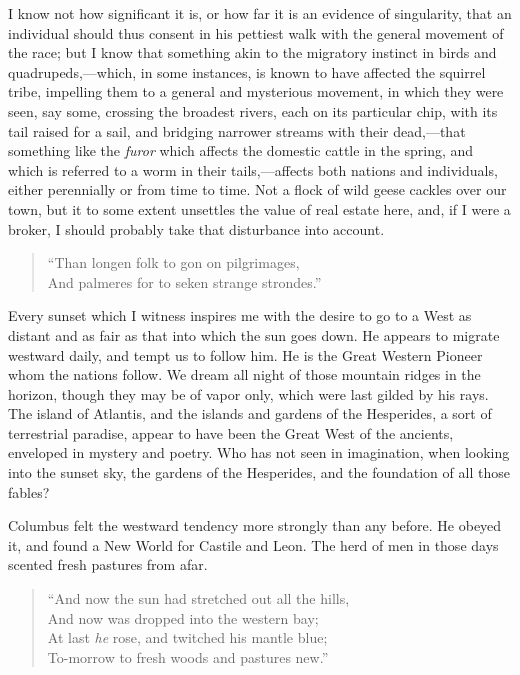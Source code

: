 \documentclass[twoside,openright,10pt]{memoir} %
\begin{document}
I know not how significant it is, or how far it is an evidence of singularity, that an individual should thus consent in his pettiest walk with the general movement of the race; but I know that something akin to the migratory instinct in birds and quadrupeds,—which, in some instances, is known to have affected the squirrel tribe, impelling them to a general and mysterious movement, in which they were seen, say some, crossing the broadest rivers, each on its particular chip, with its tail raised for a sail, and bridging narrower streams with their dead,—that something like the \emph{furor} which affects the domestic cattle in the spring, and which is referred to a worm in their tails,—affects both nations and individuals, either perennially or from time to time. Not a flock of wild geese cackles over our town, but it to some extent unsettles the value of real estate here, and, if I were a broker, I should probably take that disturbance into account.
\begin{quotation}
“Than longen folk to gon on pilgrimages,\\
And palmeres for to seken strange strondes.”
\end{quotation}

Every sunset which I witness inspires me with the desire to go to a West as distant and as fair as that into which the sun goes down. He appears to migrate westward daily, and tempt us to follow him. He is the Great Western Pioneer whom the nations follow. We dream all night of those mountain ridges in the horizon, though they may be of vapor only, which were last gilded by his rays. The island of Atlantis, and the islands and gardens of the Hesperides, a sort of terrestrial paradise, appear to have been the Great West of the ancients, enveloped in mystery and poetry. Who has not seen in imagination, when looking into the sunset sky, the gardens of the Hesperides, and the foundation of all those fables?

Columbus felt the westward tendency more strongly than any before. He obeyed it, and found a New World for Castile and Leon. The herd of men in those days scented fresh pastures from afar.
\begin{verse}
“And now the sun had stretched out all the hills,\\
And now was dropped into the western bay;\\
At last \emph{he} rose, and twitched his mantle blue;\\
To-morrow to fresh woods and pastures new.”\\
\end{verse}
\end{document}
